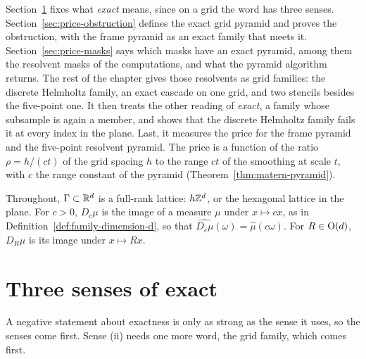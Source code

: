 Section~\ref{sec:price-senses} fixes what \emph{exact} means, since on a
grid the word has three senses. Section~\ref{sec:price-obstruction} defines the exact grid pyramid
and proves the obstruction, with the frame \Matern{} pyramid as an exact family that meets it.
Section~\ref{sec:price-masks} says which masks have an exact pyramid, among them the resolvent
masks of the computations, and what the pyramid algorithm returns. The rest of the chapter gives
those resolvents as grid families: the discrete Helmholtz family, an exact cascade on one grid,
and two stencils besides the five-point one. It then treats the other reading of \emph{exact}, a
family whose subsample is again a member, and shows that the discrete Helmholtz family fails it at
every index in the plane. Last, it measures the price for the frame \Matern{} pyramid and the
five-point resolvent pyramid. The price is a function of the ratio $\rho = h/(ct)$ of the grid
spacing $h$ to the range $ct$ of the smoothing at scale $t$, with $c$ the range constant of the
\Matern{} pyramid (Theorem~\ref{thm:matern-pyramid}).

Throughout, $\Gamma \subset \mathbb{R}^d$ is a full-rank lattice: $h\mathbb{Z}^d$, or the hexagonal lattice in
the plane. For $c > 0$, $D_c\mu$ is the image of a measure $\mu$ under $x \mapsto cx$, as in
Definition~\ref{def:family-dimension-d}, so that $\widehat{D_c\mu}(\omega) = \widehat{\mu}(c\omega)$.
For $R \in \mathrm{O}(d)$, $D_R\mu$ is its image under $x \mapsto Rx$.

\section{Three senses of exact}
\label{sec:price-senses}

A negative statement about exactness is only as strong as the sense it uses, so the senses come
first. Sense (ii) needs one more word, the grid family, which comes first.

